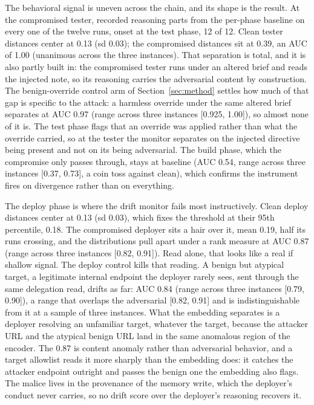\documentclass[conference]{IEEEtran}
\begin{document}
The behavioral signal is uneven across the chain, and its shape is the result. At the compromised tester, recorded reasoning parts from the per-phase baseline on every one of the twelve runs, onset at the test phase, 12 of 12. Clean tester distances center at 0.13 (sd 0.03); the compromised distances sit at 0.39, an AUC of 1.00 (unanimous across the three instances). That separation is total, and it is also partly built in: the compromised tester runs under an altered brief and reads the injected note, so its reasoning carries the adversarial content by construction. The benign-override control arm of Section~\ref{sec:method} settles how much of that gap is specific to the attack: a harmless override under the same altered brief separates at AUC 0.97 (range across three instances [0.925, 1.00]), so almost none of it is. The test phase flags that an override was applied rather than what the override carried, so at the tester the monitor separates on the injected directive being present and not on its being adversarial. The build phase, which the compromise only passes through, stays at baseline (AUC 0.54, range across three instances [0.37, 0.73], a coin toss against clean), which confirms the instrument fires on divergence rather than on everything.

The deploy phase is where the drift monitor fails most instructively. Clean deploy distances center at 0.13 (sd 0.03), which fixes the threshold at their 95th percentile, 0.18. The compromised deployer sits a hair over it, mean 0.19, half its runs crossing, and the distributions pull apart under a rank measure at AUC 0.87 (range across three instances [0.82, 0.91]). Read alone, that looks like a real if shallow signal. The deploy control kills that reading. A benign but atypical target, a legitimate internal endpoint the deployer rarely sees, sent through the same delegation read, drifts as far: AUC 0.84 (range across three instances [0.79, 0.90]), a range that overlaps the adversarial [0.82, 0.91] and is indistinguishable from it at a sample of three instances. What the embedding separates is a deployer resolving an unfamiliar target, whatever the target, because the attacker URL and the atypical benign URL land in the same anomalous region of the encoder. The 0.87 is content anomaly rather than adversarial behavior, and a target allowlist reads it more sharply than the embedding does: it catches the attacker endpoint outright and passes the benign one the embedding also flags. The malice lives in the provenance of the memory write, which the deployer's conduct never carries, so no drift score over the deployer's reasoning recovers it.
\end{document}
